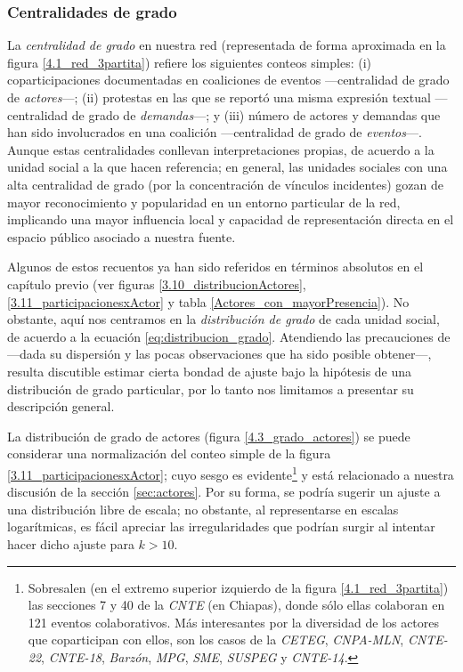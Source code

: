 \documentclass[letterpaper, 11pt]{book}
\theoremstyle{definition}
\theoremstyle{remark}
\begin{document}
\subsubsection{Centralidades de grado}
\label{subsubsec:Centralidades_grado_3part}

La \emph{centralidad de grado} en nuestra red (representada de forma aproximada en la figura \ref{4.1_red_3partita}) refiere los siguientes conteos simples: 
(i) coparticipaciones documentadas en coaliciones de eventos ---centralidad de grado de \emph{actores}---; 
(ii) protestas en las que se reportó una misma expresión textual ---centralidad de grado de \emph{demandas}---; 
y (iii) número de actores y demandas que han sido involucrados en una coalición ---centralidad de grado de \emph{eventos}---. 
Aunque estas centralidades conllevan interpretaciones propias, de acuerdo a la unidad social a la que hacen referencia; en general, las unidades sociales con una alta centralidad de grado (por la concentración de vínculos incidentes) gozan de mayor reconocimiento y popularidad en un entorno particular de la red, implicando una mayor influencia local y capacidad de representación directa en el espacio público asociado a nuestra fuente. 


Algunos de estos recuentos ya han sido referidos en términos absolutos en el capítulo previo (ver figuras \ref{3.10_distribucionActores}, \ref{3.11_participacionesxActor} y tabla \ref{Actores_con_mayorPresencia}). 
No obstante, aquí nos centramos en la \emph{distribución de grado} de cada unidad social, de acuerdo a la ecuación \ref{eq:distribucion_grado}. 
Atendiendo las precauciones de \citet{2009_PowerLaw_Clauset_EtAl} ---dada su dispersión y las pocas observaciones que ha sido posible obtener---, resulta discutible estimar cierta bondad de ajuste bajo la hipótesis de una distribución de grado particular, por lo tanto nos limitamos a presentar su descripción general. 



La distribución de grado de actores (figura \ref{4.3_grado_actores}) se puede considerar una normalización del conteo simple de la figura \ref{3.11_participacionesxActor}; cuyo sesgo es evidente\footnote{
    Sobresalen (en el extremo superior izquierdo de la figura \ref{4.1_red_3partita}) las secciones 7 y 40 de la \emph{CNTE} (en Chiapas), donde sólo ellas colaboran en 121 eventos colaborativos. 
    Más interesantes por la diversidad de los actores que coparticipan con ellos, son los casos de la \emph{CETEG}, \emph{CNPA-MLN}, \emph{CNTE-22}, \emph{CNTE-18}, \emph{Barzón}, \emph{MPG}, \emph{SME}, \emph{SUSPEG} y \emph{CNTE-14}. 
} y está relacionado a nuestra discusión de la sección \ref{sec:actores}. 
Por su forma, se podría sugerir un ajuste a una distribución libre de escala; no obstante, al representarse en escalas logarítmicas, es fácil apreciar las irregularidades que podrían surgir al intentar hacer dicho ajuste para $k > 10$. 
\end{document}
